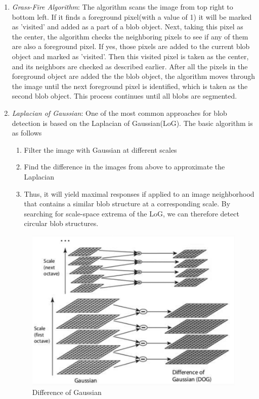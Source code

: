 \documentclass{article}
\begin{document}
	\begin{enumerate}
		\item \textit{Grass-Fire Algorithm}: The algorithm scans the image from top right to bottom left. If it finds a foreground pixel(with a value of 1) it will be marked as 'visited' and added as a part of a blob object. Next, taking this pixel as the center, the algorithm checks the  neighboring pixels to see if any of them are also a foreground pixel. If yes, those pixels are added to the current blob object and marked as 'visited'. Then this visited pixel is taken as the center, and its neighbors are checked as described earlier. After all the pixels in the foreground object are added the the blob object, the algorithm moves through the image until the next foreground pixel is identified, which is taken as the second blob object. This process continues until all blobs are segmented.
		
		\item \textit{Laplacian of Gaussian}: One of the most common approaches for blob detection is based on the Laplacian of Gaussian(LoG). The basic algorithm is as follows
		
		\begin{enumerate}
			\item Filter the image with Gaussian at different scales
			\item Find the difference in the images from above to approximate the Laplacian			
			\item  Thus, it will yield maximal responses if applied to an
			image neighborhood that contains a similar  blob structure at
			a corresponding scale. By searching for scale-space extrema of the LoG, we can
			therefore detect circular blob structures.
		\end{enumerate}
	
	\begin{figure}[!h]
		\centering
		\includegraphics[scale = 0.4]{figures/DoG.png}
		\caption{Difference of Gaussian}
	\end{figure}
		
		
	\end{enumerate}
	
\end{document}
